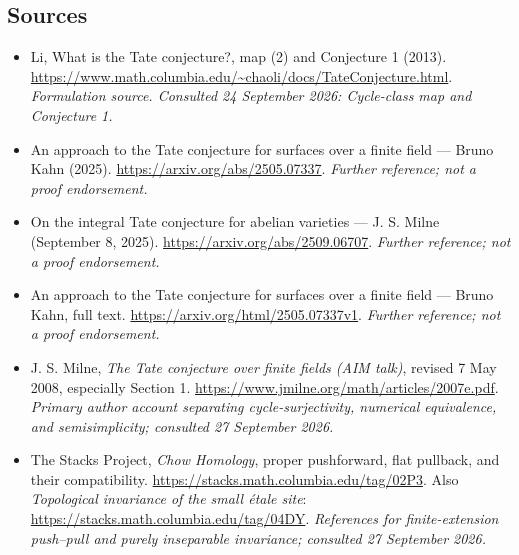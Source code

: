 \documentclass[11pt]{article}
\begin{document}
\subsection{Sources}
\begin{itemize}
\item[S1]Li, What is the Tate conjecture?, map (2) and Conjecture 1 (2013).
\url{https://www.math.columbia.edu/~chaoli/docs/TateConjecture.html}.
\textit{Formulation source. Consulted 24 September 2026: Cycle-class map and Conjecture 1.}
\item[S2]An approach to the Tate conjecture for surfaces over a finite field — Bruno Kahn (2025).
\url{https://arxiv.org/abs/2505.07337}.
\textit{Further reference; not a proof endorsement.}
\item[S3]On the integral Tate conjecture for abelian varieties — J. S. Milne (September 8, 2025).
\url{https://arxiv.org/abs/2509.06707}.
\textit{Further reference; not a proof endorsement.}
\item[S4]An approach to the Tate conjecture for surfaces over a finite field — Bruno Kahn, full text.
\url{https://arxiv.org/html/2505.07337v1}.
\textit{Further reference; not a proof endorsement.}
\item[E1]J. S. Milne, \emph{The Tate conjecture over finite fields (AIM talk)}, revised 7 May 2008, especially Section 1.
\url{https://www.jmilne.org/math/articles/2007e.pdf}.
\textit{Primary author account separating cycle-surjectivity, numerical equivalence, and semisimplicity; consulted 27 September 2026.}
\item[E2]The Stacks Project, \emph{Chow Homology}, proper pushforward, flat pullback, and their compatibility.
\url{https://stacks.math.columbia.edu/tag/02P3}.
Also \emph{Topological invariance of the small \'etale site}:
\url{https://stacks.math.columbia.edu/tag/04DY}.
\textit{References for finite-extension push--pull and purely inseparable invariance; consulted 27 September 2026.}
\end{itemize}
\end{document}
